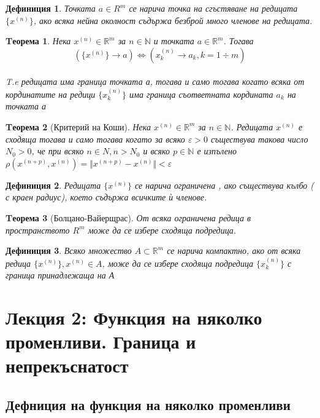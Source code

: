 \documentclass[a4paper,fleqn,12pt]{article}
\newtheorem{theorem}{Tеорема}[subsection]
\newtheorem{definition}{Дефиниция}[subsection]
\theoremstyle{definition}
\begin{document}
\begin{definition}
Точката $a \in R^m$ се нарича точка на сгъстяване на редицата $\{ x^{(n)} \}$, ако всяка нейна околност съдържа безброй много членове на редицата. 
\end{definition}

\begin{theorem}
Нека $x^{(n)} \in \mathbb{R}^m$ за $n \in \mathbb{N} $ и точката $a \in \mathbb{R}^m$. Тогава 
$$(\{x^{(n)}\} \to a )\iff (x_k ^{(n)} \to a_k, k = 1 \div m)$$\\
T.e редицата има граница точката а, тогава и само тогава когато всяка от кординатите на редици $\{x_k^{(n)}\}$ има граница съответната кордината $a_k$ на точката а
\end{theorem}

\begin{theorem}[Критерий на Коши]
Нека $x^{(n)} \in \mathbb{R}^m$ за $n \in \mathbb{N} $. Редицата $x^{(n)}$ е сходяща тогава и само тогава когато за всяко $\varepsilon > 0$ съществува такова число $N_0 > 0$, че при всяко $n \in N, n > N_0$ и всяко $p \in \mathbb{N}$ е изпълено $\rho(x^{(n+p)}, x^{(n)}) = \Vert x^{(n+p)} - x^{(n)} \Vert < \varepsilon$
\end{theorem}

\begin{definition}
Редицата $\{x^{(n)}\}$ се нарича ограничена , ако съществува кълбо ( с краен радиус), което съдържа всичките ѝ членове. 
\end{definition}


\begin{theorem}[Болцано-Вайерщрас]
От всяка ограничена редица в пространството $R^m$ може да се избере сходяща подредица. 
\end{theorem}


\begin{definition}
Всяко множество $A \subset \mathbb{R}^m $ се нарича компактно, ако от всяка редица $\{x^{(n)}\}, x^{(n)} \in A$, може да се избере сходяща подредица $\{x_k ^{(n)}\}$ с граница принадлежаща на А
\end{definition}

\newpage

\section{Лекция 2: Функция на няколко променливи. Граница и непрекъснатост}

\subsection{Дефниция на функция на няколко променливи}
\end{document}
